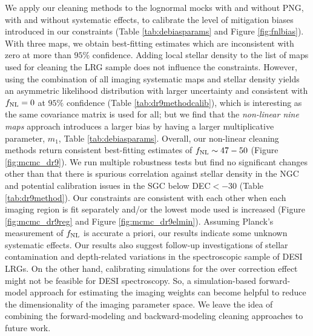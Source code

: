 We apply our cleaning methods to the lognormal mocks with and without PNG, with and without systematic effects, to calibrate the level of mitigation biases introduced in our constraints (Table \ref{tab:debiasparams} and Figure \ref{fig:fnlbias}). With three maps, we obtain best-fitting estimates which are inconsistent with zero at more than $95\%$ confidence. Adding local stellar density to the list of maps used for cleaning the LRG sample does not influence the constraints. However, using the combination of all imaging systematic maps and stellar density yields an asymmetric likelihood distribution with larger uncertainty and consistent with $f_{\rm NL}=0$ at $95\%$ confidence (Table \ref{tab:dr9methodcalib}), which is interesting as the same covariance matrix is used for all; but we find that the \textit{non-linear nine maps} approach introduces a larger bias by having a larger multiplicative parameter, $m_{1}$, Table \ref{tab:debiasparams}. Overall, our non-linear cleaning methods return consistent best-fitting estimates of $f_{\rm NL} \sim 47-50$ (Figure \ref{fig:mcmc_dr9}). We run multiple robustness tests but find no significant changes other than that there is spurious correlation against stellar density in the NGC and potential calibration issues in the SGC below DEC$< -30$ (Table \ref{tab:dr9method}). Our constraints are consistent with each other when each imaging region is fit separately and/or the lowest mode used is increased (Figure \ref{fig:mcmc_dr9reg} and Figure \ref{fig:mcmc_dr9elmin}). Assuming Planck's measurement of $f_{\rm NL}$ is accurate a priori, our results indicate some unknown systematic effects.  Our results also suggest follow-up investigations of stellar contamination and depth-related variations in the spectroscopic sample of DESI LRGs.  On the other hand, calibrating simulations for the over correction effect might not be feasible for DESI spectroscopy. So, a simulation-based forward-model approach for estimating the imaging weights can become helpful to reduce the dimensionality of the imaging parameter space. We leave the idea of combining the forward-modeling and backward-modeling cleaning approaches to future work.